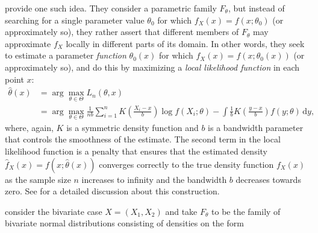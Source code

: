 \citet{hjor:jone:1996} provide one such idea. They consider a parametric family $F_{\theta}$, but instead of searching for a single parameter value $\theta_0$ for which $f_X\left(x\right) = f\left(x;\theta_0\right)$ (or approximately so), they rather assert that different members of $F_{\theta}$ may approximate $f_X$ locally in different parts of its domain. In other words, they seek to estimate a parameter \emph{function} $\theta_0\left(x\right)$ for which $f_X\left(x\right) = f\left(x;\theta_0\left(x\right)\right)$ (or approximately so), and do this by maximizing a \emph{local likelihood function} in each point $x$:
\begin{align}
\widehat\theta\left(x\right) 
&= \arg\max_{\theta \in \Theta} L_n\left(\theta, x\right) \nonumber\\ 
&= \arg\max_{\theta \in \Theta} \frac{1}{nb}\sum_{i=1}^n K\left(\frac{X_i - x}{b}\right)\log f\left(X_i; \theta\right) - \int \frac{1}{b}K\left(\frac{y - x}{b}\right)f\left(y;\theta\right)\,\textrm{d}y,
\label{eq:loclik}
\end{align}
where, again, $K$ is a symmetric density function and $b$ is a bandwidth parameter that controls the smoothness of the estimate. The second term in the local likelihood function is a penalty that ensures that the estimated density $\widehat f_X\left(x\right) = f\left(x; \widehat\theta\left(x\right)\right)$ converges correctly to the true density function $f_X\left(x\right)$ as the sample size $n$ increases to infinity and the bandwidth $b$ decreases towards zero. See \citet{hjor:jone:1996} for a detailed discussion about this construction.

\citet{tjos:huft:2013} consider the bivariate case $X = \left(X_1, X_2\right)$ and take $F_{\theta}$ to be the family of bivariate normal distributions consisting of densities on the form

